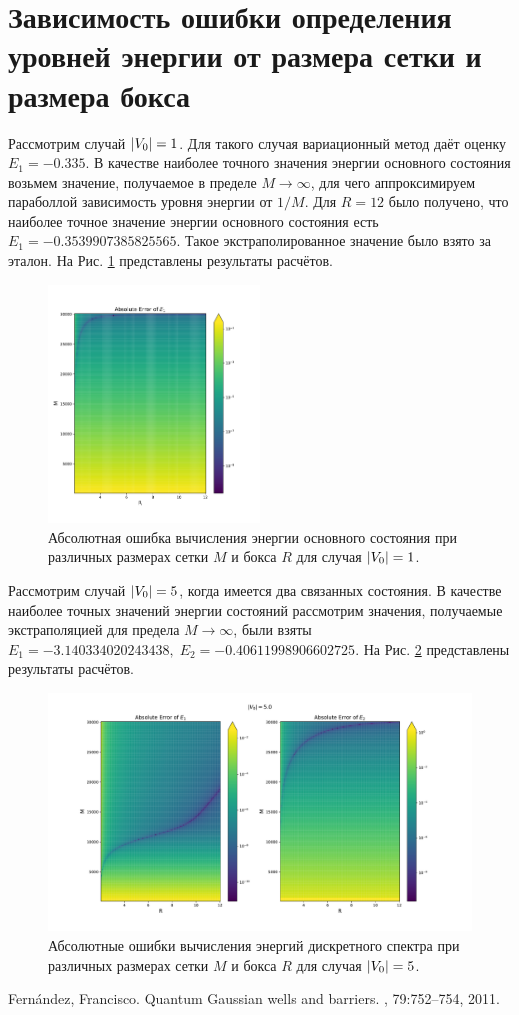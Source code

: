\documentclass[10pt]{article}
\begin{document}
\section{Зависимость ошибки определения уровней энергии от размера сетки и размера бокса}

Рассмотрим случай $\abs{V_0}=1$. Для такого случая вариационный метод даёт оценку $E_1 = -0.335$. В качестве наиболее точного значения энергии основного состояния возьмем значение, получаемое в пределе $M\rightarrow \infty$, для чего аппроксимируем параболлой зависимость уровня энергии от $1/M$. Для $R=12$ было получено, что наиболее точное значение энергии основного состояния есть $E_1 = -0.3539907385825565$. Такое экстраполированное значение было взято за эталон. На Рис. \ref{fig:abserr} представлены результаты расчётов.
\begin{figure}[htbp]
    \centering
    \includegraphics[width=0.5\textwidth]{../figures/abserr}
    \caption{Абсолютная ошибка вычисления энергии основного состояния при различных размерах сетки $M$ и бокса $R$ для случая $\abs{V_0}=1$.}
    \label{fig:abserr}
\end{figure}

Рассмотрим случай $\abs{V_0}=5$, когда имеется два связанных состояния. В качестве наиболее точных значений энергии состояний рассмотрим значения, получаемые экстраполяцией для предела $M\rightarrow \infty$, были взяты $E_1=-3.140334020243438,\; E_2= -0.40611998906602725$. На Рис. \ref{fig:abserr_v0_5} представлены результаты расчётов.
\begin{figure}[htbp]
    \centering
    \includegraphics[width=\textwidth]{../figures/abserr_v0_5}
    \caption{Абсолютные ошибки вычисления энергий дискретного спектра при различных размерах сетки $M$ и бокса $R$ для случая $\abs{V_0}=5$.}
    \label{fig:abserr_v0_5}
\end{figure}

\begin{thebibliography}{10}
    Fernández, Francisco.
    \newblock Quantum Gaussian wells and barriers.
    , 79:752--754, 2011.
\end{thebibliography}
\end{document}
